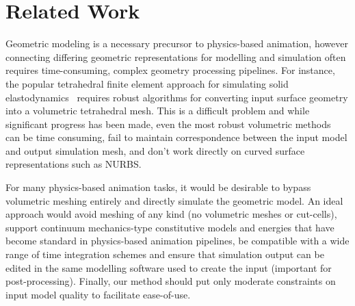 \section{Related Work}

Geometric modeling is a necessary precursor to physics-based animation, however connecting differing geometric representations for modelling and simulation often requires
time-consuming, complex geometry processing pipelines. 
For instance, the popular tetrahedral finite element approach for simulating solid elastodynamics~\cite{10.1145/2343483.2343501} requires robust algorithms for converting input surface geometry into 
a volumetric tetrahedral mesh. This is a difficult problem and while significant progress has been made,
even the most robust volumetric methods~\cite{Hu:2018:TMW:3197517.3201353} can be time consuming, fail to maintain correspondence between the input model and output simulation mesh,
and don't work directly on curved surface representations such as NURBS.  


For many physics-based animation tasks, it would be desirable to bypass volumetric meshing entirely and directly simulate the geometric model.
An ideal approach would avoid meshing of any kind (no volumetric meshes or cut-cells), support continuum mechanics-type constitutive models 
and energies that have become standard in physics-based animation pipelines, be compatible with a wide range of time integration schemes and
ensure that simulation output can be edited in the same modelling software used to create the input (important for post-processing). 
Finally, our method should put only moderate constraints on input model quality to facilitate ease-of-use.

